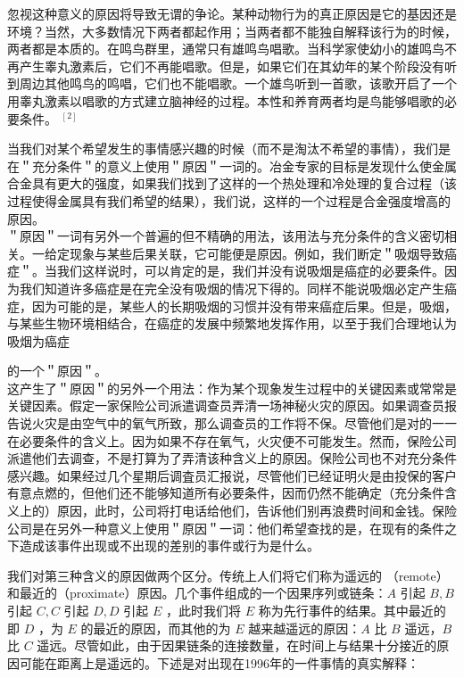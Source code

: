 忽视这种意义的原因将导致无谓的争论。某种动物行为的真正原因是它的基因还是环境？当然，大多数情况下两者都起作用；当两者都不能独自解释该行为的时候，两者都是本质的。在鸣鸟群里，通常只有雄鸣鸟唱歌。当科学家使幼小的雄鸣鸟不再产生睾丸激素后，它们不再能唱歌。但是，如果它们在其幼年的某个阶段没有听到周边其他鸣鸟的鸣唱，它们也不能唱歌。一个雄鸟听到一首歌，该歌开启了一个用睾丸激素以唱歌的方式建立脑神经的过程。本性和养育两者均是鸟能够唱歌的必要条件。 ${ }^{[2]}$

当我们对某个希望发生的事情感兴趣的时候（而不是淘汰不希望的事情），我们是在＂充分条件＂的意义上使用＂原因＂一词的。冶金专家的目标是发现什么使金属合金具有更大的强度，如果我们找到了这样的一个热处理和冷处理的复合过程（该过程使得金属具有我们希望的结果），我们说，这样的一个过程是合金强度增高的原因。\\
＂原因＂一词有另外一个普遍的但不精确的用法，该用法与充分条件的含义密切相关。一给定现象与某些后果关联，它可能便是原因。例如，我们断定＂吸烟导致癌症＂。当我们这样说时，可以肯定的是，我们并没有说吸烟是癌症的必要条件。因为我们知道许多癌症是在完全没有吸烟的情况下得的。同样不能说吸烟必定产生癌症，因为可能的是，某些人的长期吸烟的习惯并没有带来癌症后果。但是，吸烟，与某些生物环境相结合，在癌症的发展中频繁地发挥作用，以至于我们合理地认为吸烟为癌症

的一个＂原因＂。\\
这产生了＂原因＂的另外一个用法：作为某个现象发生过程中的关键因素或常常是关键因素。假定一家保险公司派遣调查员弄清一场神秘火灾的原因。如果调查员报告说火灾是由空气中的氧气所致，那么调查员的工作将不保。尽管他们是对的一一在必要条件的含义上。因为如果不存在氧气，火灾便不可能发生。然而，保险公司派遣他们去调查，不是打算为了弄清该种含义上的原因。保险公司也不对充分条件感兴趣。如果经过几个星期后调査员汇报说，尽管他们已经证明火是由投保的客户有意点燃的，但他们还不能够知道所有必要条件，因而仍然不能确定（充分条件含义上的）原因，此时，公司将打电话给他们，告诉他们别再浪费时间和金钱。保险公司是在另外一种意义上使用＂原因＂一词：他们希望查找的是，在现有的条件之下造成该事件出现或不出现的差别的事件或行为是什么。

我们对第三种含义的原因做两个区分。传统上人们将它们称为遥远的 （remote）和最近的（proximate）原因。几个事件组成的一个因果序列或链条：$A$ 引起 $B, B$ 引起 $C, C$ 引起 $D, D$ 引起 $E$ ，此时我们将 $E$ 称为先行事件的结果。其中最近的即 $D$ ，为 $E$ 的最近的原因，而其他的为 $E$ 越来越遥远的原因：$A$ 比 $B$ 遥远，$B$ 比 $C$ 遥远。尽管如此，由于因果链条的连接数量，在时间上与结果十分接近的原因可能在距离上是遥远的。下述是对出现在1996年的一件事情的真实解释：

